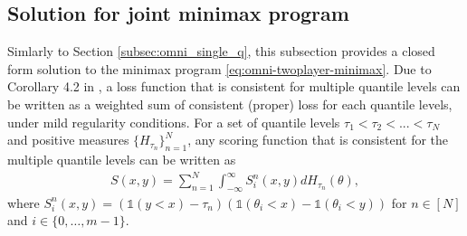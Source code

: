 \documentclass{article}
\newtheorem{lemma}{Lemma}
\newcommand{\one}{\mathds{1}}
\newcommand{\E}{\mathbb{E}}
\newcommand{\cd}{\mathcal{D}}
\begin{document}
\subsection{Solution for joint minimax program} \label{subsec:omni_multi_q}
Simlarly to Section \ref{subsec:omni_single_q}, this subsection provides a closed form solution to the minimax program \eqref{eq:omni-twoplayer-minimax}. 
Due to Corollary 4.2 in \cite{fissler2016multiq}, a loss function that is consistent for multiple quantile levels can be written as a weighted sum of consistent (proper) loss for each quantile levels, under mild regularity conditions. For a set of quantile levels $\tau_1 < \tau_2 < ... < \tau_N$ and positive measures $\{H_{\tau_n}\}_{n=1}^N$, any scoring function that is consistent for the multiple quantile levels can be written as
\begin{align}\label{eq:multi_q_consistent_score}
  S(x,y) = \sum_{n=1}^N \int_{-\infty}^{\infty} S_i^n(x,y) dH_{\tau_n}(\theta),
\end{align}
where $S_i^n(x,y) = (\one(y<x)-\tau_n)(\one(\theta_i<x)-\one(\theta_i<y))$ for $n \in [N]$ and $i \in \{0, \ldots, m-1\}$.



\end{document}
